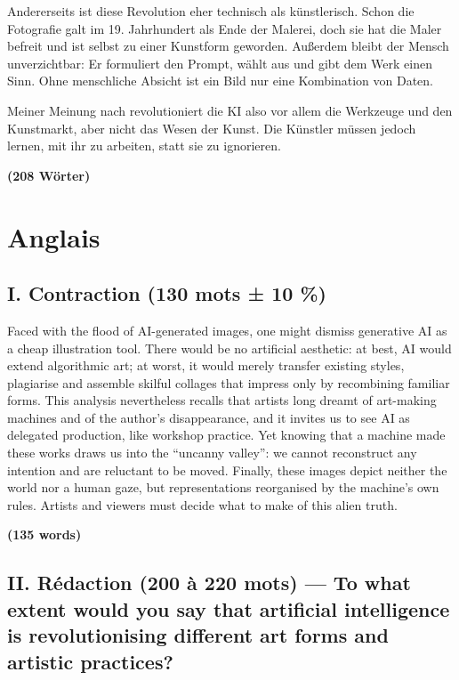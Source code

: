 \documentclass[11pt,a4paper]{article}
\begin{document}
Andererseits ist diese Revolution eher technisch als künstlerisch. Schon die Fotografie galt im 19. Jahrhundert als Ende der Malerei, doch sie hat die Maler befreit und ist selbst zu einer Kunstform geworden. Außerdem bleibt der Mensch unverzichtbar: Er formuliert den Prompt, wählt aus und gibt dem Werk einen Sinn. Ohne menschliche Absicht ist ein Bild nur eine Kombination von Daten.

Meiner Meinung nach revolutioniert die KI also vor allem die Werkzeuge und den Kunstmarkt, aber nicht das Wesen der Kunst. Die Künstler müssen jedoch lernen, mit ihr zu arbeiten, statt sie zu ignorieren.

\textbf{(208 Wörter)}

\hypertarget{anglais}{%
\section{Anglais}\label{anglais}}

\hypertarget{i.-contraction-130-mots-10-1}{%
\subsection{I. Contraction (130 mots ± 10 \%)}\label{i.-contraction-130-mots-10-1}}

Faced with the flood of AI-generated images, one might dismiss generative AI as a cheap illustration tool. There would be no artificial aesthetic: at best, AI would extend algorithmic art; at worst, it would merely transfer existing styles, plagiarise and assemble skilful collages that impress only by recombining familiar forms. This analysis nevertheless recalls that artists long dreamt of art-making machines and of the author's disappearance, and it invites us to see AI as delegated production, like workshop practice. Yet knowing that a machine made these works draws us into the ``uncanny valley'': we cannot reconstruct any intention and are reluctant to be moved. Finally, these images depict neither the world nor a human gaze, but representations reorganised by the machine's own rules. Artists and viewers must decide what to make of this alien truth.

\textbf{(135 words)}

\hypertarget{ii.-ruxe9daction-200-uxe0-220-mots-to-what-extent-would-you-say-that-artificial-intelligence-is-revolutionising-different-art-forms-and-artistic-practices}{%
\subsection{II. Rédaction (200 à 220 mots) --- To what extent would you say that artificial intelligence is revolutionising different art forms and artistic practices?}\label{ii.-ruxe9daction-200-uxe0-220-mots-to-what-extent-would-you-say-that-artificial-intelligence-is-revolutionising-different-art-forms-and-artistic-practices}}
\end{document}

